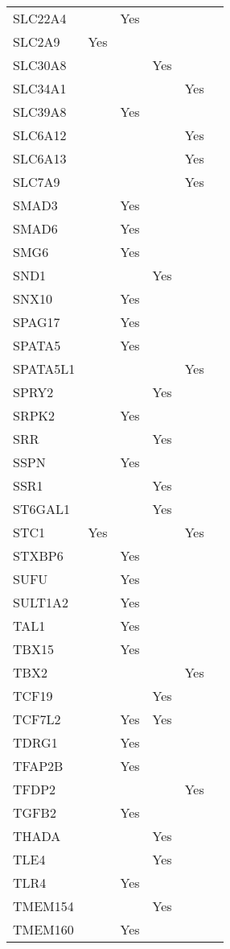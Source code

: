 \documentclass[twoside,openright]{report}
\begin{document}
\begin{appendices}
\begin{longtable}[t]{llllll}
SLC22A4 &  & Yes &  &  & \\
SLC2A9 & Yes &  &  &  & \\
SLC30A8 &  &  & Yes &  & \\
SLC34A1 &  &  &  & Yes & \\
SLC39A8 &  & Yes &  &  & \\
SLC6A12 &  &  &  & Yes & \\
SLC6A13 &  &  &  & Yes & \\
SLC7A9 &  &  &  & Yes & \\
SMAD3 &  & Yes &  &  & \\
SMAD6 &  & Yes &  &  & \\
SMG6 &  & Yes &  &  & \\
SND1 &  &  & Yes &  & \\
SNX10 &  & Yes &  &  & \\
SPAG17 &  & Yes &  &  & \\
SPATA5 &  & Yes &  &  & \\
SPATA5L1 &  &  &  & Yes & \\
SPRY2 &  &  & Yes &  & \\
SRPK2 &  & Yes &  &  & \\
SRR &  &  & Yes &  & \\
SSPN &  & Yes &  &  & \\
SSR1 &  &  & Yes &  & \\
ST6GAL1 &  &  & Yes &  & \\
STC1 & Yes &  &  & Yes & \\
STXBP6 &  & Yes &  &  & \\
SUFU &  & Yes &  &  & \\
SULT1A2 &  & Yes &  &  & \\
TAL1 &  & Yes &  &  & \\
TBX15 &  & Yes &  &  & \\
TBX2 &  &  &  & Yes & \\
TCF19 &  &  & Yes &  & \\
TCF7L2 &  & Yes & Yes &  & \\
TDRG1 &  & Yes &  &  & \\
TFAP2B &  & Yes &  &  & \\
TFDP2 &  &  &  & Yes & \\
TGFB2 &  & Yes &  &  & \\
THADA &  &  & Yes &  & \\
TLE4 &  &  & Yes &  & \\
TLR4 &  & Yes &  &  & \\
TMEM154 &  &  & Yes &  & \\
TMEM160 &  & Yes &  &  & \\

\end{longtable}
\end{appendices}
\end{document}

